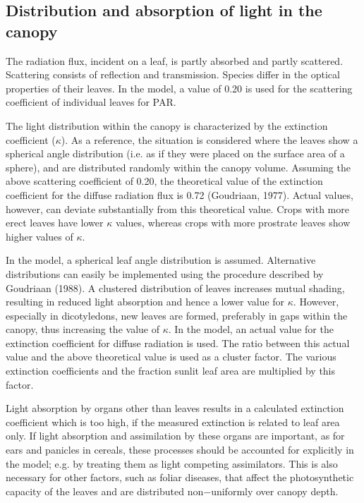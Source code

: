 \subsection{Distribution and absorption of light in the canopy} 

The radiation flux, incident on a leaf, is partly absorbed and partly scattered. Scattering
consists of reflection and transmission. Species differ in the optical properties of their
leaves. In the model, a value of 0.20 is used for the scattering coefficient of individual 
leaves for PAR.

The light distribution within the canopy is characterized by the extinction coefficient ($\kappa$).
As a reference, the situation is considered where the leaves show a spherical angle
distribution (i.e. as if they were placed on the surface area of a sphere), and are 
distributed randomly within the canopy volume. Assuming the above scattering coefficient of
0.20, the theoretical value of the extinction coefficient for the diffuse radiation flux is
0.72 (Goudriaan, 1977). Actual values, however, can deviate substantially from this
theoretical value. Crops with more erect leaves have lower $\kappa$ values, whereas crops with
more prostrate leaves show higher values of $\kappa$. 

In the model, a spherical leaf angle
distribution is assumed. Alternative distributions can easily be implemented using the
procedure described by Goudriaan (1988). A clustered distribution of leaves increases
mutual shading, resulting in reduced light absorption and hence a lower value for $\kappa$.
However, especially in dicotyledons, new leaves are formed, preferably in gaps within the
canopy, thus increasing the value of $\kappa$. In the model, an actual value for the extinction
coefficient for diffuse radiation is used. The ratio between this actual value and the above
theoretical value is used as a cluster factor. The various extinction coefficients and the
fraction sunlit leaf area are multiplied by this factor.

Light absorption by organs other than leaves results in a calculated extinction coefficient
which is too high, if the measured extinction is related to leaf area only. If light 
absorption and assimilation by these organs are important, as for ears and panicles in cereals,
these processes should be accounted for explicitly in the model; e.g. by treating them as
light competing assimilators. This is also necessary for other factors, such as foliar
diseases, that affect the photosynthetic capacity of the leaves and are distributed
non$-$uniformly over canopy depth.

